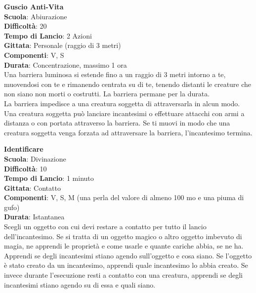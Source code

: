 \begin{multicols}{2}
\medskip\textbf{Guscio Anti-Vita}\\
\textbf{Scuola}: Abiurazione\\
\textbf{Difficoltà}:  20\\
\textbf{Tempo di Lancio}: 2 Azioni\\
\textbf{Gittata}: Personale (raggio di 3 metri)\\
\textbf{Componenti}: V, S\\
\textbf{Durata}: Concentrazione, massimo 1 ora\\
Una barriera luminosa si estende fino a un raggio di 3 metri intorno a te, muovendosi con te e rimanendo centrata su di te, tenendo distanti le creature che non siano non morti o costrutti. La barriera permane per la durata. \\
La barriera impedisce a una creatura soggetta di attraversarla in alcun modo. Una creatura soggetta può lanciare incantesimi o effettuare attacchi con armi a distanza o con portata attraverso la barriera. Se ti muovi in modo che una creatura soggetta venga forzata ad attraversare la barriera, l'incantesimo termina.

\medskip\textbf{Identificare}\\
\textbf{Scuola}: Divinazione\\
\textbf{Difficoltà}:  10\\
\textbf{Tempo di Lancio}: 1 minuto\\
\textbf{Gittata}: Contatto\\
\textbf{Componenti}: V, S, M (una perla del valore di almeno 100 mo e una piuma di gufo)\\ \textbf{Durata}: Istantanea\\
Scegli un oggetto con cui devi restare a contatto per tutto il lancio dell'incantesimo. Se si tratta di un oggetto magico o altro oggetto imbevuto di magia, ne apprendi le proprietà e come usarle e quante cariche abbia, se ne ha. Apprendi se degli incantesimi stiano agendo sull'oggetto e cosa siano. Se l’oggetto è stato creato da un incantesimo, apprendi quale incantesimo lo abbia creato. Se invece durante l’esecuzione resti a contatto con una creatura, apprendi se degli incantesimi stiano agendo su di essa e quali siano.


\end{multicols}
